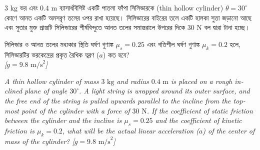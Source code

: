 \documentclass[12pt, a4paper]{article}
\begin{document}
\begin{tcolorbox}[questionbox={প্রশ্ন (Question) 10}]
\noindent
$3\text{ kg}$ ভর এবং $0.4\text{ m}$ ব্যাসার্ধবিশিষ্ট একটি পাতলা ফাঁপা সিলিন্ডারকে (thin hollow cylinder) $\theta = 30^\circ$ কোণে আনত একটি অমসরৃণ তলের ওপর রাখা হয়েছে। সিলিন্ডারের বাইরের তলে একটি হালকা সুতা জড়ানো আছে এবং সুতার মুক্ত প্রান্তটি সিলিন্ডারের শীর্ষবিন্দুতে আনত তলের সমান্তরালে উপরের দিকে $30\text{ N}$ বল দ্বারা টানা হচ্ছে। 

\vspace{0.3em}
\noindent
সিলিন্ডার ও আনত তলের মধ্যকার স্থিতি ঘর্ষণ গুণাঙ্ক $\mu_s = 0.25$ এবং গতিশীল ঘর্ষণ গুণাঙ্ক $\mu_k = 0.2$ হলে, সিলিন্ডারটির ভরকেন্দ্রের প্রকৃত রৈখিক ত্বরণ ($a$) কত হবে? \\
\textit{[$g = 9.8\text{ m/s}^2$]}

\vspace{0.8em}
\begin{english}
\noindent\textit{\color{darkgray}
A thin hollow cylinder of mass $3\text{ kg}$ and radius $0.4\text{ m}$ is placed on a rough inclined plane of angle $30^\circ$. A light string is wrapped around its outer surface, and the free end of the string is pulled upwards parallel to the incline from the topmost point of the cylinder with a force of $30\text{ N}$. If the coefficient of static friction between the cylinder and the incline is $\mu_s = 0.25$ and the coefficient of kinetic friction is $\mu_k = 0.2$, what will be the actual linear acceleration ($a$) of the center of mass of the cylinder? [$g = 9.8\text{ m/s}^2$]
}
\end{english}
\end{tcolorbox}
\end{document}
